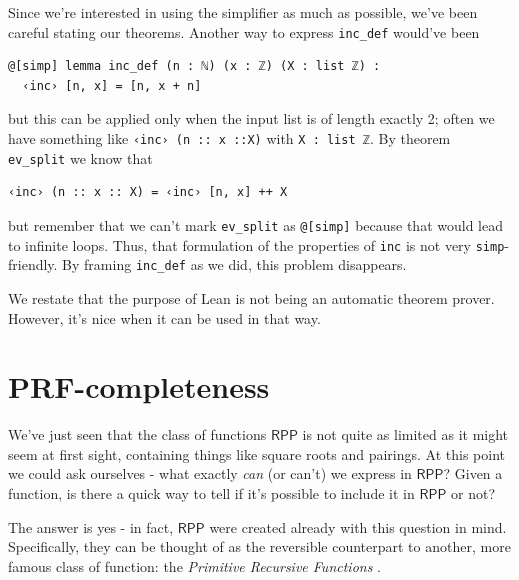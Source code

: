 \documentclass{book}
\theoremstyle{definition}
\theoremstyle{remark}
\theoremstyle{plain}
\newcommand{\RPP}{\mathsf{RPP}}
\begin{document}
Since we're interested in using the simplifier as much as possible,
we've been careful stating our theorems.
Another way to express \lstinline{inc_def} would've been
\begin{lstlisting}
@[simp] lemma inc_def (n : ℕ) (x : ℤ) (X : list ℤ) :
  ‹inc› [n, x] = [n, x + n]
\end{lstlisting}
but this can be applied only when the input list is of length exactly 2;
often we have something like \lstinline{‹inc› (n :: x ::X)} with \lstinline{X : list ℤ}.
By theorem \lstinline{ev_split} we know that
\begin{lstlisting}
‹inc› (n :: x :: X) = ‹inc› [n, x] ++ X
\end{lstlisting}
but remember that we can't mark \lstinline{ev_split} as \lstinline{@[simp]} because
that would lead to infinite loops.
Thus, that formulation of the properties of \lstinline{inc} is not very \lstinline{simp}-friendly.
By framing \lstinline{inc_def} as we did, this problem disappears.

We restate that the purpose of Lean is not being an automatic theorem prover.
However, it's nice when it can be used in that way.

\section{PRF-completeness} \label{prfcompleteness}

We've just seen that the class of functions $\RPP$ is not quite as limited as it might seem at first sight,
containing things like square roots and pairings.
At this point we could ask ourselves - what exactly \textit{can} (or can't) we express in $\RPP$?
Given a function, is there a quick way to tell if it's possible to include it in $\RPP$ or not?

The answer is yes - in fact, $\RPP$ were created already with this question in mind.
Specifically, they can be thought of as the reversible counterpart to another,
more famous class of function: the \textit{Primitive Recursive Functions} \cite{odifreddi1989book}.
\end{document}
